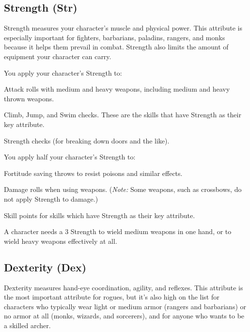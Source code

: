 \subsection{Strength (Str)}
Strength measures your character's muscle and physical power. This attribute is especially important for fighters, barbarians, paladins, rangers, and monks because it helps them prevail in combat. Strength also limits the amount of equipment your character can carry.

You apply your character's Strength to:
\begin{itemize*}
\item Attack rolls with medium and heavy weapons, including medium and heavy thrown weapons.
\item Climb, Jump, and Swim checks. These are the skills that have Strength as their key attribute.
\item Strength checks (for breaking down doors and the like).
\end{itemize*}
You apply half your character's Strength to:
\begin{itemize*}
\item Fortitude saving throws to resist poisons and similar effects.
\item Damage rolls when using weapons. (\emph{Note:} Some weapons, such as crossbows, do not apply Strength to damage.)
\item Skill points for skills which have Strength as their key attribute.
\end{itemize*}
\par A character needs a 3 Strength to wield medium weapons in one hand, or to wield heavy weapons effectively at all.

\subsection{Dexterity (Dex)}
Dexterity measures hand-eye coordination, agility, and reflexes. This attribute is the most important attribute for rogues, but it's also high on the list for characters who typically wear light or medium armor (rangers and barbarians) or no armor at all (monks, wizards, and sorcerers), and for anyone who wants to be a skilled archer.

